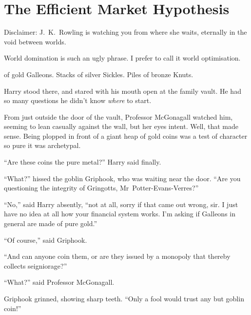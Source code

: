 \chapter[The Efficient Market Hypothesis]{The Efficient Market Hypothesis\protect\authorsnotefootnotemark}

\begin{chapterOpeningAuthorNote}
Disclaimer: J.~K.~Rowling is watching you from where she waits, eternally in the void between worlds.
\end{chapterOpeningAuthorNote}
\begin{chapterOpeningQuote}
World domination is such an ugly phrase. I prefer to call it world optimisation.
\end{chapterOpeningQuote}


 of gold Galleons. Stacks of silver Sickles. Piles of bronze Knuts.

\hplettrineextrapara
Harry stood there, and stared with his mouth open at the family vault. He had so many questions he didn’t know \emph{where} to start.

From just outside the door of the vault, Professor McGonagall watched him, seeming to lean casually against the wall, but her eyes intent. Well, that made sense. Being plopped in front of a giant heap of gold coins was a test of character so pure it was archetypal.

“Are these coins the pure metal?” Harry said finally.

“What?” hissed the goblin Griphook, who was waiting near the door.
“Are you questioning the integrity of Gringotts, Mr~Potter-Evans-Verres?”

“No,” said Harry absently, “not at all, sorry if that came out wrong, sir. I just have no idea at all how your financial system works. I’m asking if Galleons in general are made of pure gold.”

“Of course,” said Griphook.

“And can anyone coin them, or are they issued by a monopoly that thereby collects seigniorage?”

“What?” said Professor McGonagall.

Griphook grinned, showing sharp teeth.
“Only a fool would trust any but goblin coin!”

